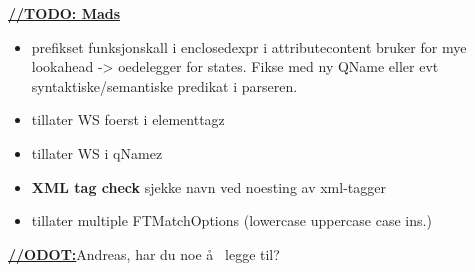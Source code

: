 \underline{\textbf{\LARGE //TODO: Mads}}
\begin{itemize}
		\item prefikset funksjonskall i enclosedexpr i attributecontent bruker for mye lookahead -> oedelegger for states. Fikse med ny QName eller evt syntaktiske/semantiske predikat i parseren.
		\item tillater WS foerst i elementtagz
		\item tillater WS i qNamez
		\item \textbf{XML tag check} sjekke navn ved noesting av xml-tagger
		\item tillater multiple FTMatchOptions (lowercase uppercase case ins.)
	\end{itemize}

\underline{\textbf{\LARGE //ODOT:}}Andreas, har du noe \aa~ legge til?




